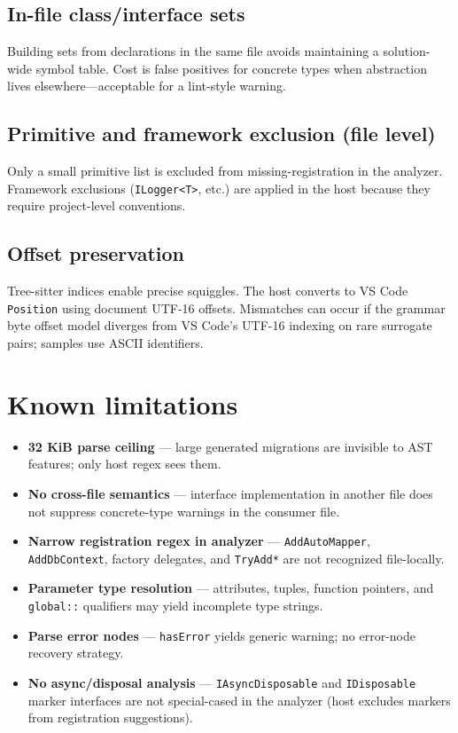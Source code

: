 \subsection{In-file class/interface sets}

Building sets from declarations in the same file avoids maintaining a solution-wide symbol table. Cost is false positives for concrete types when abstraction lives elsewhere---acceptable for a lint-style warning.

\subsection{Primitive and framework exclusion (file level)}

Only a small primitive list is excluded from missing-registration in the analyzer. Framework exclusions (\texttt{ILogger<T>}, etc.) are applied in the host because they require project-level conventions.

\subsection{Offset preservation}

Tree-sitter indices enable precise squiggles. The host converts to VS Code \texttt{Position} using document UTF-16 offsets. Mismatches can occur if the grammar byte offset model diverges from VS Code's UTF-16 indexing on rare surrogate pairs; samples use ASCII identifiers.

\section{Known limitations}
\label{chap3:limitations}

\begin{itemize}
	\item \textbf{32 KiB parse ceiling} --- large generated migrations are invisible to AST features; only host regex sees them.
	\item \textbf{No cross-file semantics} --- interface implementation in another file does not suppress concrete-type warnings in the consumer file.
	\item \textbf{Narrow registration regex in analyzer} --- \texttt{AddAutoMapper}, \texttt{AddDbContext}, factory delegates, and \texttt{TryAdd*} are not recognized file-locally.
	\item \textbf{Parameter type resolution} --- attributes, tuples, function pointers, and \texttt{global::} qualifiers may yield incomplete type strings.
	\item \textbf{Parse error nodes} --- \texttt{hasError} yields generic warning; no error-node recovery strategy.
	\item \textbf{No async/disposal analysis} --- \texttt{IAsyncDisposable} and \texttt{IDisposable} marker interfaces are not special-cased in the analyzer (host excludes markers from registration suggestions).
\end{itemize}


